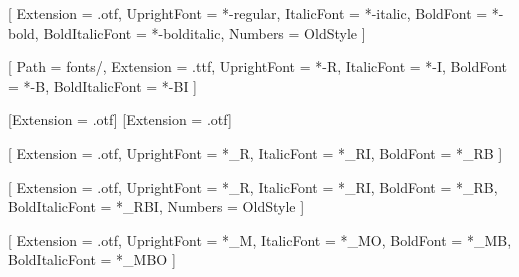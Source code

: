 
\usepackage{fontspec}

\setmainfont{texgyreschola}[
  Extension      = .otf,
  UprightFont    = *-regular,
  ItalicFont     = *-italic,
  BoldFont       = *-bold,
  BoldItalicFont = *-bolditalic,
  Numbers        = OldStyle
]


[
  Path           = fonts/,
  Extension      = .ttf,
  UprightFont    = *-R,
  ItalicFont     = *-I,
  BoldFont       = *-B,
  BoldItalicFont = *-BI
]

[Extension = .otf]
[Extension = .otf]

% 
% 

% 

\setsansfont{LinBiolinum}[
  Extension      = .otf,
  UprightFont    = *_R,
  ItalicFont     = *_RI,
  BoldFont       = *_RB
]

\setmainfont{LinLibertine}[
  Extension      = .otf,
  UprightFont    = *_R,
  ItalicFont     = *_RI,
  BoldFont       = *_RB,
  BoldItalicFont = *_RBI,
  Numbers        = OldStyle
]

\setmonofont{LinLibertine}[
  Extension      = .otf,
  UprightFont    = *_M,
  ItalicFont     = *_MO,
  BoldFont       = *_MB,
  BoldItalicFont = *_MBO
]

